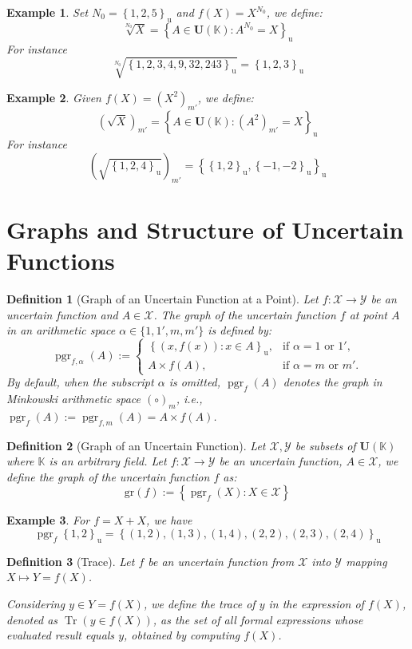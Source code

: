 \documentclass[a4paper,12pt,twoside]{memoir}
\newtheorem{definition}{Definition}[chapter]
\newtheorem{example}{Example}[chapter]
\DeclareMathOperator{\Tr}{Tr}
\DeclareMathOperator{\pgr}{pgr}
\newcommand{\set}[1]{\left\{#1\right\}} %
\newcommand{\s}[1]{\set{#1}_\mathrm{u}} %
\newcommand{\tsbd}[1]{\mathbf{U}(\mathbb{#1})}
\newcommand{\gr}[1]{\text{gr}(#1)} %
\newcommand{\kgdtmr}[1]{\left(#1\right)_{m'}} %
\begin{document}
	\begin{example}
		Set $N_0 = \s{1,2,5}$ and $f(X)=X^{N_0}$, we define: \[\sqrt[N_0]{X} = \s{A \in \tsbd{K} : A^{N_0} = X}\]
		For instance \[\sqrt[N_0]{\s{1, 2, 3, 4, 9, 32, 243}} = \s{1,2,3}\]
	\end{example}
	
	\begin{example}
		Given $f(X)=\kgdtmr{X^2}$, we define: \[\kgdtmr{\sqrt{X}} = \s{A \in \tsbd{K} : \kgdtmr{A^2} = X}\]
		For instance \[\kgdtmr{\sqrt{\s{1, 2, 4}}} = \s{\s{1,2},\s{-1,-2}}\]
	\end{example}
	
	\section{Graphs and Structure of Uncertain Functions}
	
	\begin{definition}[Graph of an Uncertain Function at a Point]
		Let $f : \mathcal{X} \to \mathcal{Y}$ be an uncertain function and $A \in \mathcal{X}$. The graph of the uncertain function $f$ at point $A$ in an arithmetic space $\alpha \in \{1, 1', m, m'\}$ is defined by:
		\[
		\pgr_{f, \alpha}(A) := \begin{cases}
			\s{(x, f(x)) : x \in A}, & \text{if } \alpha = 1 \text{ or } 1',  \\[1ex]
			A \times f(A),           & \text{if } \alpha = m \text{ or } m'.
		\end{cases}
		\]
		By default, when the subscript $\alpha$ is omitted, $\pgr_f(A)$ denotes the graph in Minkowski arithmetic space $(\circ)_m$, i.e., $\pgr_f(A) := \pgr_{f, m}(A) = A \times f(A)$.
	\end{definition}
	
	\begin{definition}[Graph of an Uncertain Function]
		Let $\mathcal{X} ,\mathcal{Y}$ be subsets of $\tsbd{K}$ where $\mathbb{K}$ is an arbitrary field.
		Let $f : \mathcal{X} \to \mathcal{Y}$ be an uncertain function, $A \in \mathcal{X}$, we define the graph of the uncertain function $f$ as:
		\[\gr{f}:= \set{\pgr_f(X) : X \in \mathcal{X}}\]
	\end{definition}
	
	\begin{example}
		For $f = X+X$, we have \[\pgr_f{\s{1,2}} = \s{(1,2),(1,3),(1,4),(2,2),(2,3),(2,4)}\]
	\end{example}
	
	\begin{definition}[Trace]
		Let $f$ be an uncertain function from $\mathcal{X}$ into $\mathcal{Y}$ mapping $X \mapsto Y = f(X)$.
		
		Considering $y \in Y = f(X)$, we define the trace of $y$ in the expression of $f(X)$, denoted as $\Tr(y \in f(X))$, as the set of all formal expressions whose evaluated result equals $y$, obtained by computing $f(X)$.
	\end{definition}
	
\end{document}
